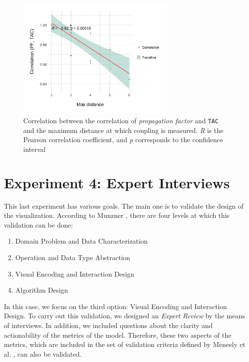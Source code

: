 \begin{figure}[ht!]
\begin{center}
\includegraphics[width=0.7\textwidth]{figures/results/correlation_max_distance_TAC.png}
\caption{Correlation between the correlation of \textit{propagation factor} and \texttt{TAC} and the maximum distance at which coupling is measured. \textit{R} is the Pearson correlation coefficient, and \textit{p} corresponds to the confidence interval}
\label{fig:cor-dist-tac}
\end{center}
\end{figure}

\section{Experiment 4: Expert Interviews}
This last experiment has various goals. The main one is to validate the design of the visualization. According to Munzner \cite{Munzner2009}, there are four levels at which this validation can be done:

\begin{enumerate}
  \item Domain Problem and Data Characterization
  \item Operation and Data Type Abstraction
  \item Visual Encoding and Interaction Design
  \item Algorithm Design
\end{enumerate}

In this case, we focus on the third option: Visual Encoding and Interaction Design. To carry out this validation, we designed an \textit{Expert Review} by the means of interviews. In addition, we included questions about the clarity and actionability of the metrics of the model. Therefore, these two aspects of the metrics, which are included in the set of validation criteria defined by Meneely et al. \cite{Meneely2012}, can also be validated.

